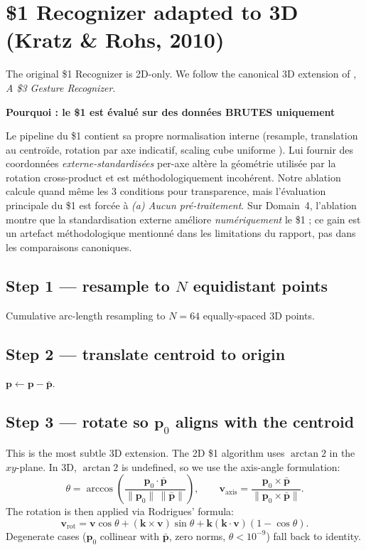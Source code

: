 \documentclass[11pt,a4paper]{article}
\newenvironment{whybox}[1]{%
    \begin{shaded*}\noindent\textbf{Pourquoi : #1}\par\vspace{0.3em}}
    {\end{shaded*}}
\renewenvironment{shaded*}
    {\definecolor{shadecolor}{named}{whyboxbg}\begin{shaded}}
    {\end{shaded}}
\begin{document}
\section{\texorpdfstring{\$1}{\$1} Recognizer adapted to 3D
                       (Kratz \& Rohs, 2010)}\label{sec:dollar-raw}

The original \$1 Recognizer \cite{wobbrock2007dollar1} is 2D-only.
We follow the canonical 3D extension of
\cite{kratz2010dollar3}, \emph{A \$3 Gesture Recognizer}.

\begin{whybox}{le \$1 est évalué sur des données BRUTES uniquement}
Le pipeline du \$1 contient sa propre normalisation interne
(resample, translation au centroïde, rotation par axe indicatif,
scaling cube uniforme \cite{wobbrock2007dollar1,kratz2010dollar3}).
Lui fournir des coordonnées \emph{externe-standardisées} per-axe
altère la géométrie utilisée par la rotation cross-product et est
méthodologiquement incohérent. Notre ablation calcule quand même les
3 conditions pour transparence, mais l'évaluation principale du \$1
est forcée à \emph{(a) Aucun pré-traitement}. Sur Domain~4,
l'ablation montre que la standardisation externe améliore
\emph{numériquement} le \$1 ; ce gain est un artefact méthodologique
mentionné dans les limitations du rapport, pas dans les comparaisons
canoniques.
\end{whybox}

\subsection{Step 1 --- resample to $N$ equidistant points}
Cumulative arc-length resampling to $N=64$ equally-spaced 3D points.

\subsection{Step 2 --- translate centroid to origin}
$\mathbf{p}\leftarrow \mathbf{p}-\bar{\mathbf{p}}$.

\subsection{Step 3 --- rotate so $\mathbf{p}_0$ aligns with the centroid}
This is the most subtle 3D extension. The 2D \$1 algorithm uses
$\arctan 2$ in the $xy$-plane. In 3D, $\arctan 2$ is undefined, so we
use the axis-angle formulation:
\[
\theta = \arccos\!\left(\frac{\mathbf{p}_0\cdot\bar{\mathbf{p}}}
                              {\|\mathbf{p}_0\|\,\|\bar{\mathbf{p}}\|}\right),
\qquad
\mathbf{v}_{\text{axis}} =
\frac{\mathbf{p}_0\times\bar{\mathbf{p}}}
     {\|\mathbf{p}_0\times\bar{\mathbf{p}}\|}.
\]
The rotation is then applied via Rodrigues' formula:
\[
\mathbf{v}_{\text{rot}}
 = \mathbf{v}\cos\theta
 + (\mathbf{k}\times\mathbf{v})\sin\theta
 + \mathbf{k}(\mathbf{k}\!\cdot\!\mathbf{v})(1-\cos\theta).
\]
Degenerate cases ($\mathbf{p}_0$ collinear with $\bar{\mathbf{p}}$,
zero norms, $\theta < 10^{-9}$) fall back to identity.
\end{document}
